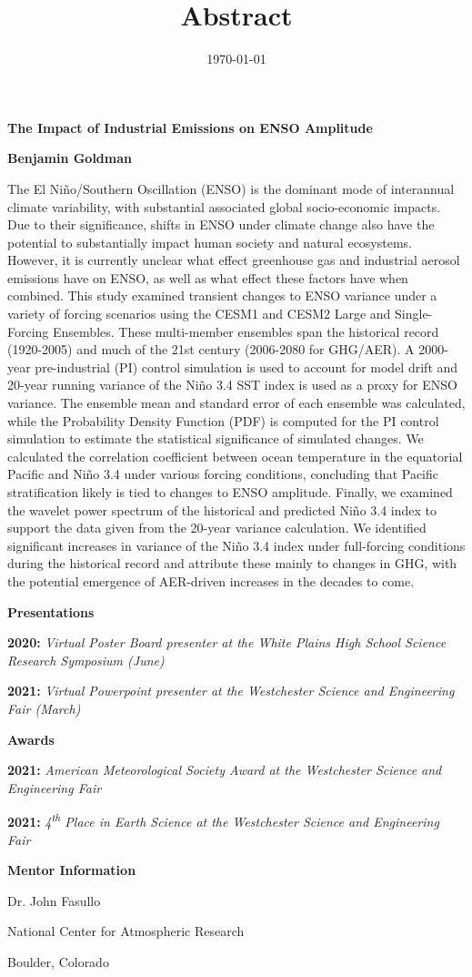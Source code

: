 \documentclass[11pt]{article}
\date{\today}
\title{Abstract}
\begin{document}
\begin{center}
\textbf{The Impact of Industrial Emissions on ENSO Amplitude}

\textbf{Benjamin Goldman}
\end{center}

The El Niño/Southern Oscillation (ENSO) is the dominant mode of interannual climate variability, with substantial associated global socio-economic impacts. Due to their significance, shifts in ENSO under climate change also have the potential to substantially impact human society and natural ecosystems. However, it is currently unclear what effect greenhouse gas and industrial aerosol emissions have on ENSO, as well as what effect these factors have when combined. This study examined transient changes to ENSO variance under a variety of forcing scenarios using the CESM1 and CESM2 Large and Single-Forcing Ensembles. These multi-member ensembles span the historical record (1920-2005) and much of the 21st century (2006-2080 for GHG/AER). A 2000-year pre-industrial (PI) control simulation is used to account for model drift and 20-year running variance of the Niño 3.4 SST index is used as a proxy for ENSO variance. The ensemble mean and standard error of each ensemble was calculated, while the Probability Density Function (PDF) is computed for the PI control simulation to estimate the statistical significance of simulated changes. We calculated the correlation coefficient between ocean temperature in the equatorial Pacific and Niño 3.4 under various forcing conditions, concluding that Pacific stratification likely is tied to changes to ENSO amplitude. Finally, we examined the wavelet power spectrum of the historical and predicted Niño 3.4 index to support the data given from the 20-year variance calculation. We identified significant increases in variance of the Niño 3.4 index under full-forcing conditions during the historical record and attribute these mainly to changes in GHG, with the potential emergence of AER-driven increases in the decades to come.

\begin{center}
\textbf{Presentations}
\end{center}

\textbf{2020:} \emph{Virtual Poster Board presenter at the White Plains High School Science Research Symposium (June)}

\textbf{2021:} \emph{Virtual Powerpoint presenter at the Westchester Science and Engineering Fair (March)}

\begin{center}
\textbf{Awards}
\end{center}

\textbf{2021:} \emph{American Meteorological Society Award at the Westchester Science and Engineering Fair}

\textbf{2021:} \emph{4\textsuperscript{th} Place in Earth Science at the Westchester Science and Engineering Fair}

\begin{center}
\textbf{Mentor Information}

Dr. John Fasullo

National Center for Atmospheric Research

Boulder, Colorado
\end{center}
\end{document}
